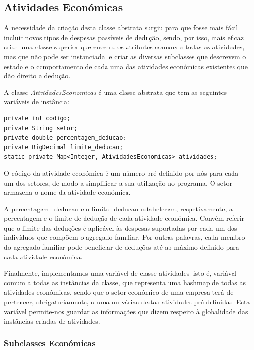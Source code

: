 \documentclass[a4paper]{article}
\begin{document}
\subsection{Atividades Económicas}
\label{sec:atividadeseconomicas}

A necessidade da criação desta classe abstrata surgiu para que fosse mais fácil
incluir novos tipos de despesas passíveis de dedução, sendo, por isso, mais eficaz
criar uma classe superior que encerra os atributos comuns a todas as atividades,
mas que não pode ser instanciada, e criar as diversas subclasses que descrevem
o estado e o comportamento de cada uma das atividades económicas existentes que dão
direito a dedução.

A classe \emph{AtividadesEconomicas} é uma classe abstrata que tem as seguintes
variáveis de instância:

\begin{verbatim}
private int codigo;
private String setor;
private double percentagem_deducao;
private BigDecimal limite_deducao;
static private Map<Integer, AtividadesEconomicas> atividades;
\end{verbatim}

\vspace{0.2cm}

O \textsf{código} da atividade económica é um número pré-definido por nós para
cada um dos setores, de modo a simplificar a sua utilização no programa.
O \textsf{setor} armazena o nome da atividade económica.

A \textsf{percentagem\_deducao} e o \textsf{limite\_deducao} estabelecem,
respetivamente, a percentagem e o limite de dedução de cada atividade económica.
Convém referir que o limite das deduções é aplicável às despesas suportadas por
cada um dos indivíduos que compõem o agregado familiar. Por outras palavras, cada
membro do agregado familiar pode beneficiar de deduções até ao máximo definido
para cada atividade económica.

Finalmente, implementamos uma variável de classe \textsf{atividades}, isto é,
variável comum a todas as instâncias da classe, que representa uma hashmap de
todas as atividades económicas, sendo que o setor económico de uma empresa terá
de pertencer, obrigatoriamente, a uma ou várias destas atividades pré-definidas.
Esta variável permite-nos guardar as informações que dizem respeito à globalidade
das instâncias criadas de atividades.



\subsubsection{Subclasses Económicas}
\label{sec:sematividade}
\end{document}
